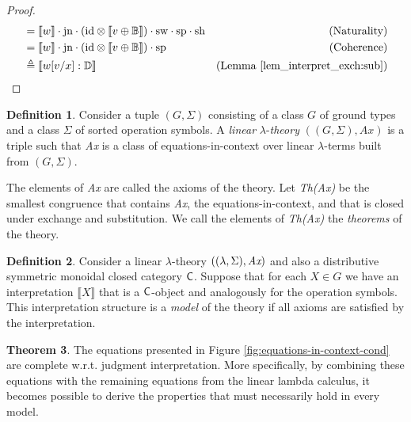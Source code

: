 \documentclass[10pt,a4paper]{amsart}
\theoremstyle{definition}
\newtheorem{definition}{Definition}[section]
\theoremstyle{definition}
\theoremstyle{definition}
\theoremstyle{definition}
\theoremstyle{definition}
\theoremstyle{definition}
\newtheorem{theorem}[definition]{Theorem}
\begin{document}
\begin{proof}
\begin{align*}
  & = \llbracket w \rrbracket \cdot \text{jn} \cdot ( \text{id} \otimes \llbracket v \oplus \mathbb{B}\rrbracket )  \cdot  \mathrm{sw}  \cdot  \text{sp} \cdot \text{sh} & {\text{(Naturality)}}\\
  &  = \llbracket w \rrbracket \cdot \text{jn} \cdot ( \text{id} \otimes \llbracket v \oplus \mathbb{B}\rrbracket )  \cdot  \text{sp} & {\text{(Coherence)}}\\
  & \triangleq \llbracket w[v/x] : \mathbb{D} \rrbracket & {\text{(Lemma \ref{lem_interpret_exch:sub})}}
\end{align*}
\end{proof}

\begin{definition}
  Consider a tuple $(G, \Sigma)$ consisting of a class $G$ of ground types and a class $\Sigma$ of sorted operation symbols. A \emph{linear} $\lambda$-\emph{theory} $((G, \Sigma), \textit{Ax})$ is a triple such that \emph{Ax} is a class of equations-in-context over linear $\lambda$-terms built from $(G, \Sigma)$.
\end{definition}

The elements of \emph{Ax} are called the axioms of the theory. Let \emph{Th(Ax)}  be the smallest congruence that contains \emph{Ax}, the equations-in-context, and that is closed under exchange
and substitution. We call the elements of  \emph{Th(Ax)} the \emph{theorems} of the theory.

\begin{definition}
  Consider a linear $\lambda$-theory $((\lambda, \Sigma), \emph{Ax})$ and
  also a distributive symmetric monoidal closed category  $\mathsf{C}$. Suppose that for each $X \in G$ we have an interpretation $\llbracket X \rrbracket$
  that is a $\mathsf{C}$-object and analogously for the operation symbols. This interpretation structure
  is a \emph{model} of the theory if all axioms are satisfied by the interpretation.
\end{definition}

\begin{theorem} \label {theorem:comp_eq_in_context}
  The equations presented in Figure \ref{fig:equations-in-context-cond} are complete w.r.t. judgment interpretation. More specifically, by combining these equations with the remaining equations from the linear lambda calculus, it becomes possible to derive the properties that must necessarily hold in every model.
\end{theorem}
\end{document}
